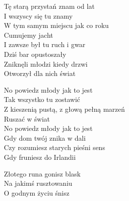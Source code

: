 \begin{text}
    Tę starą przystań znam od lat\\
    I wszyscy się tu znamy\\
    W tym samym miejscu jak co roku\\
    Cumujemy jacht\\
    I zawsze był tu ruch i gwar\\
    Dziś bar opustoszały\\
    Zniknęli młodzi kiedy drzwi\\
    Otworzył dla nich świat

    No powiedz młody jak to jest\\
    Tak wszystko tu zostawić\\
    Z kieszenią pustą, z głową pełną marzeń\\
    Ruszać w świat\\
    No powiedz młody jak to jest\\
    Gdy dom twój znika w dali\\
    Czy rozumiesz starych pieśni sens\\
    Gdy fruniesz do Irlandii

    Złotego runa gonisz blask\\
    Na jakimś rusztowaniu\\
    O godnym życiu śnisz
\end{text}
\begin{chord}

\end{chord}
